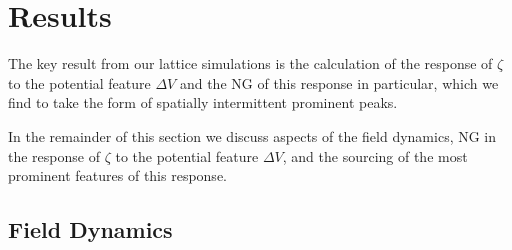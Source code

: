 

\section{Results} \label{sec:results}

The key result from our lattice simulations is the calculation of the response of $\zeta$ to the potential feature $\Delta V$ and the NG of this response in particular, which we find to take the form of spatially intermittent prominent peaks. 

In the remainder of this section we discuss aspects of the field dynamics, NG in the response of $\zeta$ to the potential feature $\Delta V$, and the sourcing of the most prominent features of this response.



\subsection{Field Dynamics} \label{sec:field dynanics}

